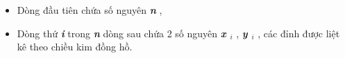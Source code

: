 \begin{itemize}
	\item Dòng đầu tiên chứa số nguyên \textbf{\emph{ n }} ,
	\item Dòng thứ \textbf{\emph{ i }} trong \textbf{\emph{ n }} dòng sau chứa 2 số nguyên \textbf{\emph{ x $_ i $}} , \textbf{\emph{ y $_ i $}} , các đỉnh được liệt kê theo chiều kim đồng hồ.
\end{itemize}